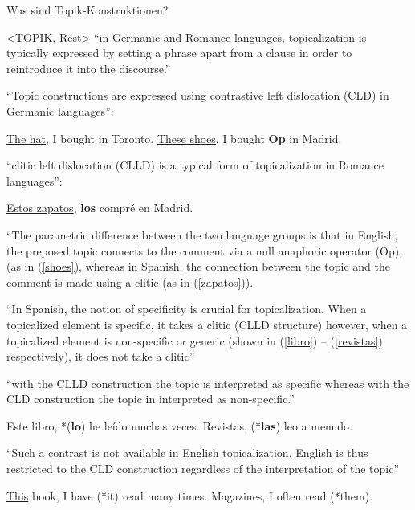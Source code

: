 Was sind Topik-Konstruktionen?

<TOPIK, Rest>
``in Germanic and Romance languages, topicalization is typically expressed by setting a phrase apart
from a clause in order to reintroduce it into the discourse.''

``Topic constructions are expressed using contrastive left dislocation (CLD) in Germanic languages'':
\begin{exe}
    \ex \uline{The hat}, I bought in Toronto.
    \ex \label{shoes} \uline{These shoes}, I bought \textbf{Op} in Madrid.
\end{exe}

``clitic left dislocation (CLLD) is a typical form of topicalization in Romance languages'':
\begin{exe}
    \ex \label{zapatos} \uline{Estos zapatos}, \textbf{los} compré en Madrid.
\end{exe}

``The parametric difference between the two language groups is that in English,
the preposed topic connects to the comment via a null anaphoric operator (Op),
(as in (\ref{shoes}), whereas in Spanish, the connection between the topic and the comment is made using a clitic (as
in (\ref{zapatos})).

``In Spanish, the notion of specificity is crucial for topicalization. When a topicalized element is
specific, it takes a clitic (CLLD structure) however, when a topicalized element is non-specific or generic
(shown in (\ref{libro}) – (\ref{revistas}) respectively), it does not take a clitic''

``with the CLLD construction the topic is
interpreted as specific whereas with the CLD construction the topic in interpreted as non-specific.''

\begin{exe}
    \ex \label{libro} Este libro, *(\textbf{lo}) he leído muchas veces.
    \ex \label{revistas} Revistas, (*\textbf{las}) leo a menudo.
\end{exe}

``Such a contrast is not available in English topicalization. English is thus restricted to the CLD construction
regardless of the interpretation of the topic''

\begin{exe}
    \ex \uline{This} book, I have (*it) read many times.
    \ex Magazines, I often read (*them).
\end{exe}

